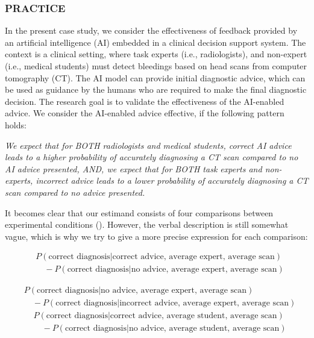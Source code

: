 \documentclass[
  man,
  floatsintext,
  longtable,
  a4paper,
  nolmodern,
  notxfonts,
  notimes,
  colorlinks=true,linkcolor=blue,citecolor=blue,urlcolor=blue]{apa7}
\begin{document}
\subsubsection{PRACTICE}\label{practice}

In the present case study, we consider the effectiveness of feedback
provided by an artificial intelligence (AI) embedded in a clinical
decision support system. The context is a clinical setting, where task
experts (i.e., radiologists), and non-expert (i.e., medical students)
must detect bleedings based on head scans from computer tomography (CT).
The AI model can provide initial diagnostic advice, which can be used as
guidance by the humans who are required to make the final diagnostic
decision. The research goal is to validate the effectiveness of the
AI-enabled advice. We consider the AI-enabled advice effective, if the
following pattern holds:

\emph{We expect that for BOTH radiologists and medical students, correct
AI advice leads to a higher probability of accurately diagnosing a CT
scan compared to no AI advice presented, AND, we expect that for BOTH
task experts and non-experts, incorrect advice leads to a lower
probability of accurately diagnosing a CT scan compared to no advice
presented.}

It becomes clear that our estimand consists of four comparisons between
experimental conditions
().
However, the verbal description is still somewhat vague, which is why we
try to give a more precise expression for each comparison:

\[
\begin{aligned}
& P(\text{correct diagnosis} | \text{correct advice, average expert, average scan}) \\
& \quad - P(\text{correct diagnosis} | \text{no advice, average expert, average scan})
\end{aligned}
\]

\[
\begin{aligned}
& P(\text{correct diagnosis} | \text{no advice, average expert, average scan}) \\
& \quad - P(\text{correct diagnosis} | \text{incorrect advice, average expert, average scan})
\end{aligned}
\] \[
\begin{aligned}
& P(\text{correct diagnosis} | \text{correct advice, average student, average scan}) \\
& \quad - P(\text{correct diagnosis} | \text{no advice, average student, average scan})
\end{aligned}
\]
\end{document}
